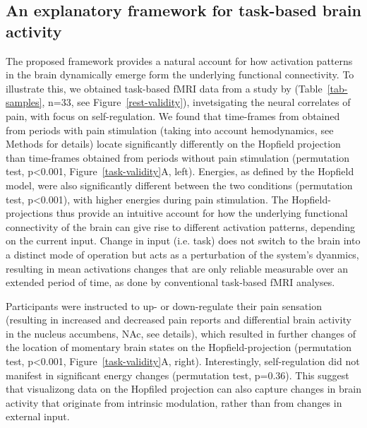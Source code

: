 \documentclass{article}
\begin{document}
\subsection{An explanatory framework for task-based brain activity}\label{An explanatory framework for task-based brain activity}

The proposed framework provides a natural account for how activation patterns in the brain dynamically emerge form the underlying functional connectivity. To illustrate this, we obtained task-based fMRI data from a study by \cite{Woo_2015} (Table~\ref{tab-samples}, n=33, see Figure~\ref{rest-validity}), invetsigating the neural correlates of pain, with focus on self-regulation.
We found that time-frames from obtained from periods with pain stimulation (taking into account hemodynamics, see Methods for details) locate significantly differently on the Hopfield projection than time-frames obtained from periods without pain stimulation (permutation test, p\textless 0.001, Figure~\ref{task-validity}A, left). Energies, as defined by the Hopfield model, were also significantly different between the two conditions (permutation test, p\textless 0.001), with higher energies during pain stimulation. The Hopfield-projections thus provide an intuitive account for how the underlying functional connectivity of the brain can give rise to different activation patterns, depending on the current input. Change in input (i.e. task) does not switch to the brain into a distinct mode of operation but acts as a perturbation of the system's dyanmics, resulting in mean activations changes that are only reliable measurable over an extended period of time, as done by conventional task-based fMRI analyses.

Participants were instructed to up- or down-regulate their pain sensation (resulting in increased and decreased pain reports and differential brain activity in the nucleus accumbens, NAc, see \cite{Woo_2015} details), which resulted in further changes of the location of momentary brain states on the Hopfield-projection (permutation test, p\textless 0.001, Figure~\ref{task-validity}A, right). Interestingly, self-regulation did not manifest in significant energy changes (permutation test, p=0.36). This suggest that visualizong data on the Hopfiled projection can also capture changes in brain activity that originate from intrinsic modulation, rather than from changes in external input.
\end{document}
